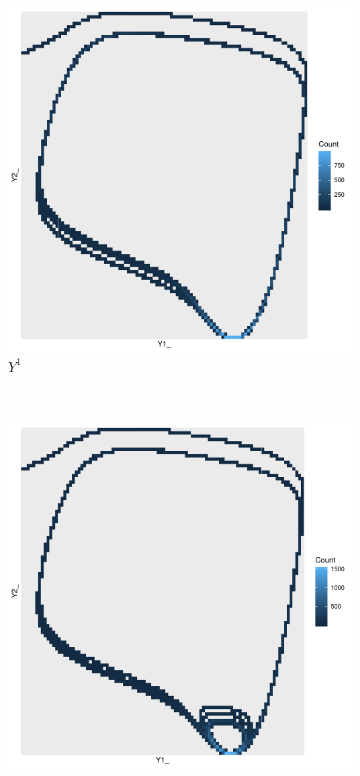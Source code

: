 \documentclass[a4paper]{article}
\begin{document}
\clearpage
\begin{figure}
    \centering
    \begin{subfigure}[b]{0.45\textwidth}
        \includegraphics[width=\textwidth]{part1b-sigma1-grid.pdf}
        \caption{$Y^1$}
    \end{subfigure}
    ~
    \begin{subfigure}[b]{0.45\textwidth}
        \includegraphics[width=\textwidth]{part1b-sigma2-grid.pdf}

\end{subfigure}
\end{figure}
\end{document}

